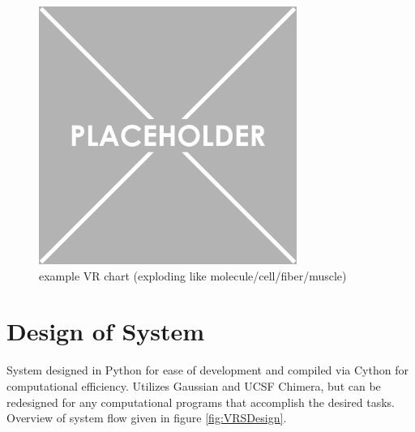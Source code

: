 \begin{figure}
	
	\centering
	
	\includegraphics[width=0.75\textwidth]{placeholder.png}
	
	\caption{example VR chart (exploding like molecule/cell/fiber/muscle)}
	
	\label{fig:variableResolutionSample}
		
\end{figure}

\section{Design of System}

System designed in Python for ease of development and compiled via Cython for computational efficiency. 
Utilizes Gaussian and UCSF Chimera, but can be redesigned for any computational programs that accomplish the desired tasks.
Overview of system flow given in figure \ref{fig:VRSDesign}.


